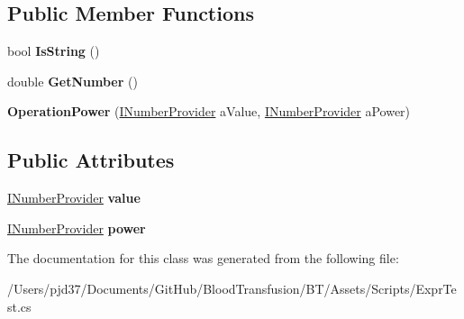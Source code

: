 \subsection*{Public Member Functions}
\begin{DoxyCompactItemize}
\item 
bool {\bfseries Is\+String} ()\hypertarget{class_b83_1_1_logic_expression_parser_1_1_operation_power_a827d5162aeb7c4b9f86cd7611da1e040}{}\label{class_b83_1_1_logic_expression_parser_1_1_operation_power_a827d5162aeb7c4b9f86cd7611da1e040}

\item 
double {\bfseries Get\+Number} ()\hypertarget{class_b83_1_1_logic_expression_parser_1_1_operation_power_a21ddf5989233d6e793109ee1a1cf4ff6}{}\label{class_b83_1_1_logic_expression_parser_1_1_operation_power_a21ddf5989233d6e793109ee1a1cf4ff6}

\item 
{\bfseries Operation\+Power} (\hyperlink{interface_b83_1_1_logic_expression_parser_1_1_i_number_provider}{I\+Number\+Provider} a\+Value, \hyperlink{interface_b83_1_1_logic_expression_parser_1_1_i_number_provider}{I\+Number\+Provider} a\+Power)\hypertarget{class_b83_1_1_logic_expression_parser_1_1_operation_power_af60c80d5e0e8c4273213594f4b22bc89}{}\label{class_b83_1_1_logic_expression_parser_1_1_operation_power_af60c80d5e0e8c4273213594f4b22bc89}

\end{DoxyCompactItemize}
\subsection*{Public Attributes}
\begin{DoxyCompactItemize}
\item 
\hyperlink{interface_b83_1_1_logic_expression_parser_1_1_i_number_provider}{I\+Number\+Provider} {\bfseries value}\hypertarget{class_b83_1_1_logic_expression_parser_1_1_operation_power_a03d7f7fad070e2ede53cfdeb329e1d29}{}\label{class_b83_1_1_logic_expression_parser_1_1_operation_power_a03d7f7fad070e2ede53cfdeb329e1d29}

\item 
\hyperlink{interface_b83_1_1_logic_expression_parser_1_1_i_number_provider}{I\+Number\+Provider} {\bfseries power}\hypertarget{class_b83_1_1_logic_expression_parser_1_1_operation_power_a7d087907e8011e21e904bf246a008612}{}\label{class_b83_1_1_logic_expression_parser_1_1_operation_power_a7d087907e8011e21e904bf246a008612}

\end{DoxyCompactItemize}


The documentation for this class was generated from the following file\+:\begin{DoxyCompactItemize}
\item 
/\+Users/pjd37/\+Documents/\+Git\+Hub/\+Blood\+Transfusion/\+B\+T/\+Assets/\+Scripts/Expr\+Test.\+cs\end{DoxyCompactItemize}

